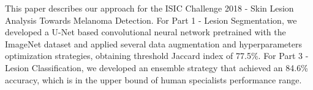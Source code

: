 This paper describes our approach for the ISIC Challenge 2018 - Skin Lesion Analysis Towards Melanoma Detection. For Part 1 - Lesion Segmentation, we developed a U-Net based convolutional neural network pretrained with the ImageNet dataset and applied several data augmentation and hyperparameters optimization strategies, obtaining threshold Jaccard index of 77.5\%. For Part 3 - Lesion Classification, we developed an ensemble strategy that achieved an 84.6\% accuracy, which is in the upper bound of human specialists performance range. 
